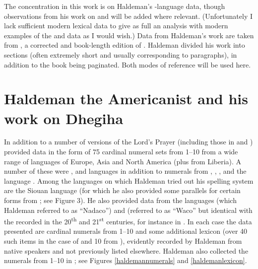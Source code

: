 \documentclass[output=paper]{LSP/langsci}
\begin{document}
The concentration in this work is on Haldeman's -language data, though observations from his work on  and  will be added where relevant. (Unfortunately I lack sufficient modern lexical data to give as full an analysis with modern examples of the  and  data as I would wish.)   Data from Haldeman's work are taken from \citet{Haldeman1860}, a corrected and book-length edition of \citet{Haldeman1859}.  Haldeman divided his work into sections (often extremely short and usually corresponding to paragraphs), in addition to the book being paginated.  Both modes of reference will be used here.  

\section{Haldeman the Americanist and his work on Dhegiha}  

 
In addition to a number of versions of the Lord's Prayer (including those in  and ) \citet{Haldeman1860}  provided data in the form of 75 cardinal numeral sets from 1--10 from a wide range of languages of Europe, Asia and North America (plus  from Liberia).  A number of these were ,  and  languages in addition to numerals from , , ,  and the  language . Among the languages on which Haldeman tried out his spelling system are the  Siouan language  (for which he also provided some  parallels for certain forms from \citealt{Riggs1852}; see Figure 3).  He also provided data from the  languages  (which Haldeman referred to as ``Nadaco'') and  (referred to as ``Waco'' but identical with the  recorded in the 20\textsuperscript{th} and 21\textsuperscript{st} centuries, for instance in \citet{Rood1975}. In each case the data presented are cardinal numerals from 1--10 and some additional lexicon (over 40 such items in the case of  and 10 from ), evidently recorded by Haldeman from native speakers and not previously listed elsewhere. Haldeman also collected the numerals from 1--10 in ; see Figures \ref{haldemannumerals} and \ref{haldemanlexicon}.   
\end{document}
